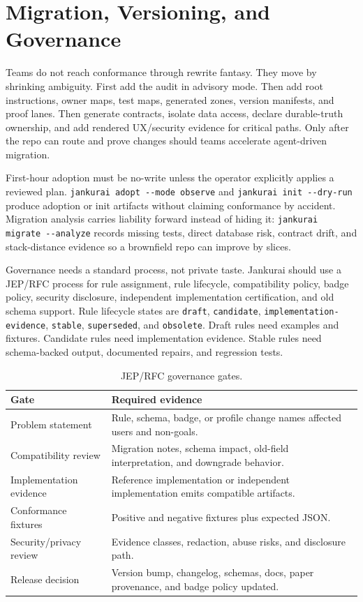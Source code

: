 \section{Migration, Versioning, and Governance}

Teams do not reach conformance through rewrite fantasy. They move by shrinking ambiguity. First add the audit in advisory mode. Then add root instructions, owner maps, test maps, generated zones, version manifests, and proof lanes. Then generate contracts, isolate data access, declare durable-truth ownership, and add rendered UX/security evidence for critical paths. Only after the repo can route and prove changes should teams accelerate agent-driven migration.

First-hour adoption must be no-write unless the operator explicitly applies a reviewed plan. \verb|jankurai adopt --mode observe| and \verb|jankurai init --dry-run| produce adoption or init artifacts without claiming conformance by accident. Migration analysis carries liability forward instead of hiding it: \verb|jankurai migrate --analyze| records missing tests, direct database risk, contract drift, and stack-distance evidence so a brownfield repo can improve by slices.

Governance needs a standard process, not private taste. Jankurai should use a JEP/RFC process for rule assignment, rule lifecycle, compatibility policy, badge policy, security disclosure, independent implementation certification, and old schema support. Rule lifecycle states are \texttt{draft}, \texttt{candidate}, \texttt{implementation-evidence}, \texttt{stable}, \texttt{superseded}, and \texttt{obsolete}. Draft rules need examples and fixtures. Candidate rules need implementation evidence. Stable rules need schema-backed output, documented repairs, and regression tests.

\begin{table}[t]
\caption{JEP/RFC governance gates.}
\label{tab:jep-governance}
\centering
\scriptsize
\begin{tabularx}{\columnwidth}{L{0.24\columnwidth} Y}
\toprule
\textbf{Gate} & \textbf{Required evidence} \\
\midrule
Problem statement & Rule, schema, badge, or profile change names affected users and non-goals. \\
Compatibility review & Migration notes, schema impact, old-field interpretation, and downgrade behavior. \\
Implementation evidence & Reference implementation or independent implementation emits compatible artifacts. \\
Conformance fixtures & Positive and negative fixtures plus expected JSON. \\
Security/privacy review & Evidence classes, redaction, abuse risks, and disclosure path. \\
Release decision & Version bump, changelog, schemas, docs, paper provenance, and badge policy updated. \\
\bottomrule
\end{tabularx}
\end{table}

